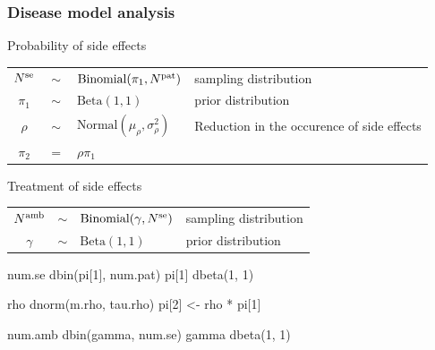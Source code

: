 \begin{frame}[fragile]

\frametitle{Disease model analysis}

{\small
Probability of side effects

\begin{tabular}{ccll}
$N^{\rm{se}}$ & $\sim$ & $\mbox{Binomial}(\pi_1, N^{\rm{pat}})$         & sampling distribution \\
$\pi_1$           & $\sim$ & $\mbox{Beta}(1, 1)$                                & prior distribution \\
$\rho$            & $\sim$ & $\mbox{Normal}(\mu_{\rho}, \sigma_{\rho}^2)$ & Reduction in the occurence of side effects \\
$\pi_2$           & $=$    & $\rho \pi_1$                                      &  \\
\end{tabular}

Treatment of side effects

\begin{tabular}{ccll}
$N^{\rm{amb}}$ & $\sim$  & $\mbox{Binomial}(\gamma, N^{\rm{se}})$  & sampling distribution \\
$\mathtt{\gamma}$  &  $\sim$ & $\mbox{Beta}(1, 1)$                         & prior distribution \\
\end{tabular}

\begin{semiverbatim}
\olive
num.se \mytilde dbin(pi[1], num.pat)
pi[1] \mytilde dbeta(1, 1)

rho \mytilde dnorm(m.rho, tau.rho)
pi[2] <- rho * pi[1]

num.amb \mytilde dbin(gamma, num.se)
gamma \mytilde dbeta(1, 1)

\end{semiverbatim}
}

\end{frame}



